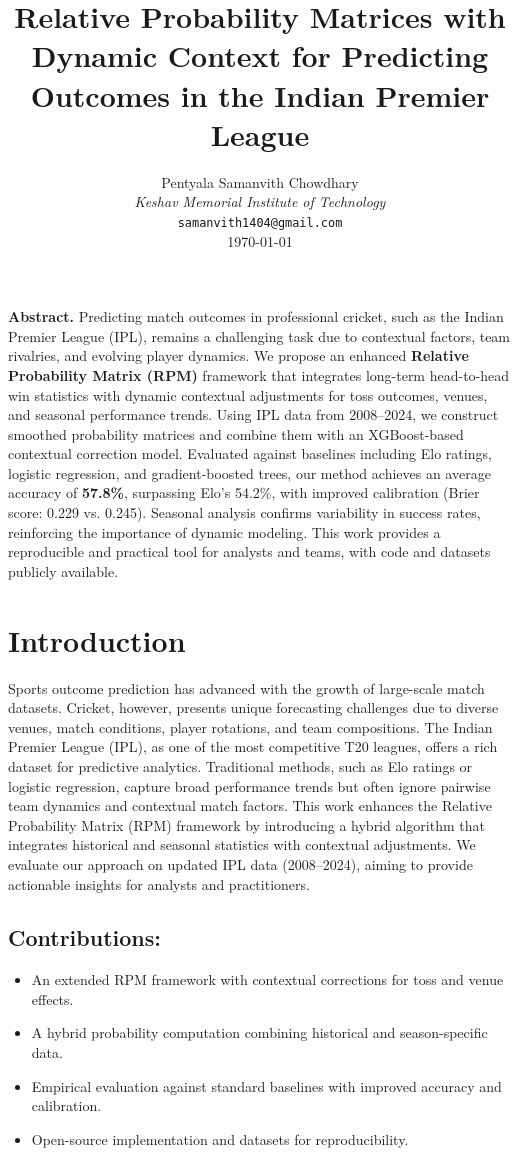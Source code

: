 \documentclass{article}
\title{Relative Probability Matrices with Dynamic Context for Predicting Outcomes in the Indian Premier League}
\author{Pentyala Samanvith Chowdhary\\[0.5em]
\textit{Keshav Memorial Institute of Technology}\\
\texttt{samanvith1404@gmail.com}\\[0.5em]
\today
}
\newenvironment{abstract}{\quotation\noindent\textbf{Abstract.}}{\endquotation}
\begin{document}
\maketitle

\begin{abstract}
Predicting match outcomes in professional cricket, such as the Indian Premier League (IPL), remains a challenging task due to contextual factors, team rivalries, and evolving player dynamics. We propose an enhanced \textbf{Relative Probability Matrix (RPM)} framework that integrates long-term head-to-head win statistics with dynamic contextual adjustments for toss outcomes, venues, and seasonal performance trends. Using IPL data from 2008--2024, we construct smoothed probability matrices and combine them with an XGBoost-based contextual correction model. Evaluated against baselines including Elo ratings, logistic regression, and gradient-boosted trees, our method achieves an average accuracy of \textbf{57.8\%}, surpassing Elo's 54.2\%, with improved calibration (Brier score: 0.229 vs. 0.245). Seasonal analysis confirms variability in success rates, reinforcing the importance of dynamic modeling. This work provides a reproducible and practical tool for analysts and teams, with code and datasets publicly available.
\end{abstract}

\section{Introduction}
Sports outcome prediction has advanced with the growth of large-scale match datasets. Cricket, however, presents unique forecasting challenges due to diverse venues, match conditions, player rotations, and team compositions. The Indian Premier League (IPL), as one of the most competitive T20 leagues, offers a rich dataset for predictive analytics. Traditional methods, such as Elo ratings or logistic regression, capture broad performance trends but often ignore pairwise team dynamics and contextual match factors. This work enhances the Relative Probability Matrix (RPM) framework by introducing a hybrid algorithm that integrates historical and seasonal statistics with contextual adjustments. We evaluate our approach on updated IPL data (2008--2024), aiming to provide actionable insights for analysts and practitioners.

\subsection*{Contributions:}
\begin{itemize}
    \item An extended RPM framework with contextual corrections for toss and venue effects.
    \item A hybrid probability computation combining historical and season-specific data.
    \item Empirical evaluation against standard baselines with improved accuracy and calibration.
    \item Open-source implementation and datasets for reproducibility.
\end{itemize}
\end{document}
